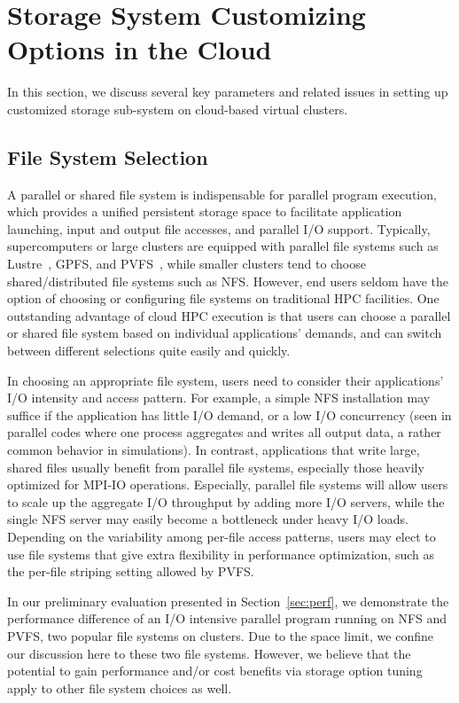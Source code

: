 \section{Storage System Customizing Options in the Cloud}
    \label{sec:options}
    In this section, we discuss several key parameters and related issues in
    setting up customized storage sub-system on cloud-based virtual clusters.

    \subsection{File System Selection}
    \label{subsec:fs}
    A parallel or shared file system is indispensable for parallel program
    execution, which provides a unified persistent storage space to facilitate
    application launching, input and output file accesses, and parallel I/O
    support.  Typically, supercomputers or large clusters are equipped with
    parallel file systems such as Lustre~\cite{lustre},
    GPFS\cite{schmuck:gpfs}, and PVFS~\cite{bib:pvfs}, while smaller clusters
    tend to choose shared/distributed file systems such as NFS.  However,
    end users seldom have the option of choosing or configuring file systems on
    traditional HPC facilities.  One outstanding advantage of cloud HPC
    execution is that users can choose a parallel or shared file system based
    on individual applications' demands, and can switch between different
    selections quite easily and quickly.

    In choosing an appropriate file system, users need to consider their
    applications' I/O intensity and access pattern. For example, a simple NFS
    installation may suffice if the application has little I/O demand, or a
    low I/O concurrency (seen in parallel codes where one process aggregates
    and writes all output data, a rather common behavior in simulations). In
    contrast, applications that write large, shared files usually benefit from
    parallel file systems, especially those heavily optimized for MPI-IO
    operations. Especially, parallel file systems will allow users to scale
    up the aggregate I/O throughput by adding more I/O servers, while the
    single NFS server may easily become a bottleneck under heavy I/O loads.
    Depending on the variability among per-file access patterns, users may
    elect to use file systems that give extra flexibility in performance
    optimization, such as the per-file striping setting allowed by PVFS.

    In our preliminary evaluation presented in Section~\ref{sec:perf}, we
    demonstrate the performance difference of an I/O intensive parallel
    program running on NFS and PVFS, two popular file systems on
    clusters.  Due to the space limit, we confine our discussion here 
    to these two file systems. However, we believe that the
    potential to gain performance and/or cost benefits via storage option
    tuning apply to other file system choices as well.

